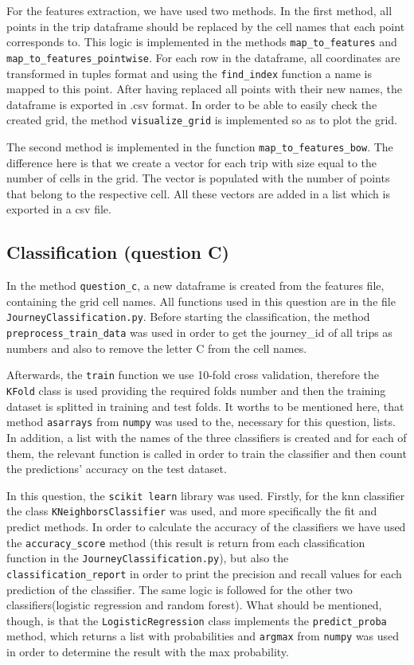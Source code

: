 \documentclass[12pt]{article}
\begin{document}
	For the features extraction, we have used two methods. In the first method, all points in the trip dataframe should be replaced by the cell names that each point corresponds to. This logic is implemented in the methods \texttt{map\_to\_features} and \texttt{map\_to\_features\_pointwise}. For each row in the dataframe, all coordinates are transformed in tuples format and using the \texttt{find\_index} function a name is mapped to this point. After having replaced all points with their new names, the dataframe is exported in .csv format. In order to be able to easily check the created grid, the method \texttt{visualize\_grid} is implemented so as to plot the grid. 
	
	The second method is implemented in the function \texttt{map\_to\_features\_bow}. The difference here is that we create a vector for each trip with size equal to the number of cells in the grid. The vector is populated with the number of points that belong to the respective cell. All these vectors are added in a list which is exported in a csv file.
	
	\subsection{Classification (question C)}
	In the method \texttt{question\_c}, a new dataframe is created from the features file, containing the grid cell names. All functions used in this question are in the file \texttt{JourneyClassification.py}. Before starting the classification, the method \texttt{preprocess\_train\_data} was used in order to get the journey\_id of all trips as numbers and also to remove the letter C from the cell names. 
	
	Afterwards, the \texttt{train} function we use 10-fold cross validation, therefore the \texttt{KFold} class is used providing the required folds number and then the training dataset is splitted in training and test folds. It worths to be mentioned here, that method \texttt{asarrays} from \texttt{numpy} was used to the, necessary for this question, lists. In addition, a list with the names of the three classifiers is created and for each of them, the relevant function is called in order to train the classifier and then count the predictions' accuracy on the test dataset. 
	
	In this question, the \texttt{scikit learn} library was used. Firstly, for the knn classifier the class \texttt{KNeighborsClassifier} was used, and more specifically the fit and predict methods. In order to calculate the accuracy of the classifiers we have used the \texttt{accuracy\_score} method (this result is return from each classification function in the \texttt{JourneyClassification.py}), but also the \texttt{classification\_report} in order to print the precision and recall values for each prediction of the classifier. The same logic is followed for the other two classifiers(logistic regression and random forest). What should be mentioned, though, is that the \texttt{LogisticRegression} class implements the \texttt{predict\_proba} method, which returns a list with probabilities and \texttt{argmax} from \texttt{numpy} was used in order to determine the result with the max probability.
	
\end{document}
